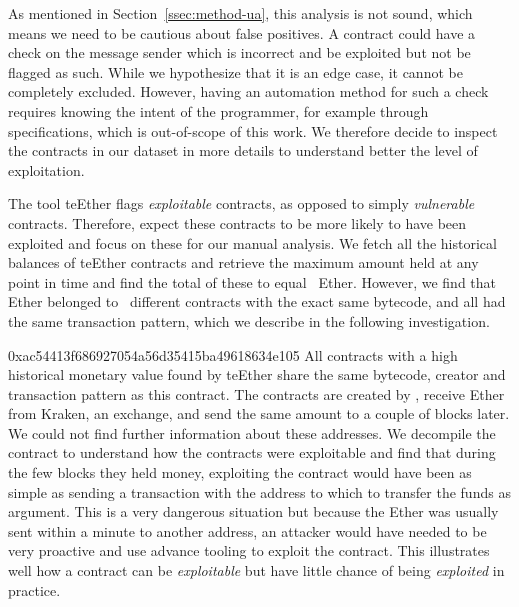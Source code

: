  As mentioned in Section~\ref{ssec:method-ua}, this analysis is not sound, which means we need to be cautious about false positives.
A contract could have a check on the message sender which is incorrect and be exploited but not be flagged as such.
While we hypothesize that it is an edge case, it cannot be completely excluded.
However, having an automation method for such a check requires knowing the intent of the programmer, for example through specifications, which is out-of-scope of this work.
We therefore decide to inspect the contracts in our dataset in more details to understand better the level of exploitation.

The tool teEther flags \emph{exploitable} contracts, as opposed to simply \emph{vulnerable} contracts.
Therefore, expect these contracts to be more likely to have been exploited and focus on these for our manual analysis.
We fetch all the historical balances of teEther contracts and retrieve the maximum amount held at any point in time and find the total of these to equal~ Ether.
However, we find that~ Ether belonged to~ different contracts with the exact same bytecode, and all had the same transaction pattern, which we describe in the following investigation.

\begin{investigation}{0xac54413f686927054a56d35415ba49618634e105}
  All contracts with a high historical monetary value found by teEther share the same bytecode, creator and transaction pattern as this contract.
  The contracts are created by , receive Ether from Kraken, an exchange, and send the same amount to  a couple of blocks later.
  We could not find further information about these addresses.
  We decompile the contract to understand how the contracts were exploitable and find that during the few blocks they held money, exploiting the contract would have been as simple as sending a transaction with the address to which to transfer the funds as argument.
  This is a very dangerous situation but because the Ether was usually sent within a minute to another address, an attacker would have needed to be very proactive and use advance tooling to exploit the contract.
  This illustrates well how a contract can be \emph{exploitable} but have little chance of being \emph{exploited} in practice.
\end{investigation}

